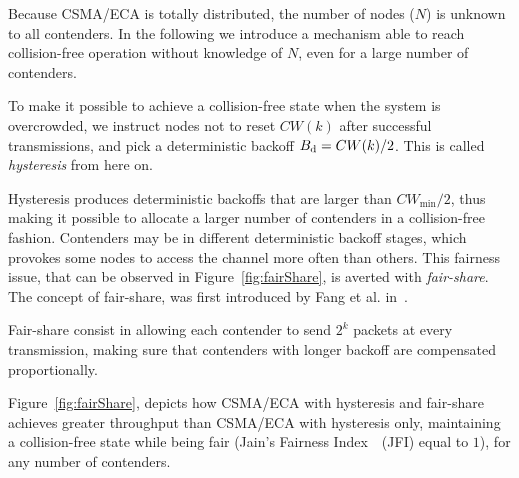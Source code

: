 Because CSMA/ECA is totally distributed, the number of nodes ($N$) is unknown to all contenders. In the following we introduce a mechanism able to reach collision-free operation without knowledge of $N$, even for a large number of contenders.



To make it possible to achieve a collision-free state when the system is overcrowded, we instruct nodes not to reset $CW(k)$ after successful transmissions, and pick a deterministic backoff $B_{\mbox{\scriptsize{d}}}=CW(k)/2$. This is called \emph{hysteresis} from here on. 






Hysteresis produces deterministic backoffs that are larger than $CW_{\min}/2$, thus making it possible to allocate a larger number of contenders in a collision-free fashion. Contenders may be in different deterministic backoff stages, which provokes some nodes to access the channel more often than others. This fairness issue, that can be observed in Figure~\ref{fig:fairShare}, is averted with \emph{fair-share}. The concept of fair-share, was first introduced by Fang et al. in~\cite{L_MAC2}.


Fair-share consist in allowing each contender to send $2^{k}$ packets at every transmission, making sure that contenders with longer backoff are compensated proportionally.

Figure~\ref{fig:fairShare}, depicts how CSMA/ECA with hysteresis and fair-share achieves greater throughput than CSMA/ECA with hysteresis only, maintaining a collision-free state while being fair (Jain's Fairness Index~\cite{JFI}~(JFI) equal to $1$), for any number of contenders.


